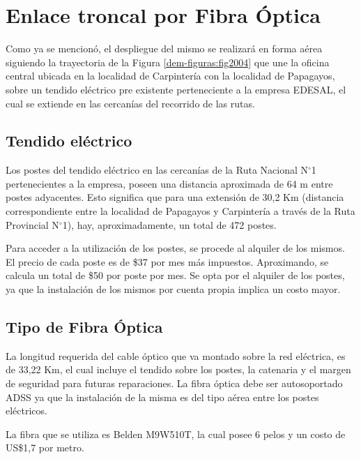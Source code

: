 \section{Enlace troncal por Fibra Óptica}

Como ya se mencionó, el despliegue del mismo se realizará en forma aérea siguiendo la  trayectoria de la Figura \ref{dem-figuras:fig2004} que une la oficina central ubicada en la localidad de Carpintería con la localidad de Papagayos, sobre un tendido eléctrico pre existente perteneciente a la empresa EDESAL, el cual se extiende en las cercanías  del recorrido de las rutas.

\subsection{Tendido eléctrico}

Los postes del tendido eléctrico en las cercanías de la Ruta Nacional N{$^{\circ}$}1 pertenecientes a la empresa, poseen una distancia aproximada de 64 m entre postes adyacentes. Esto significa que para una extensión de 30,2 Km (distancia correspondiente entre la localidad de Papagayos y Carpintería a través de la Ruta Provincial N{$^{\circ}$}1), hay, aproximadamente, un total de 472 postes.


Para acceder a la utilización de los postes, se procede al alquiler de los mismos. El precio de cada poste es de \$37 por mes más impuestos. Aproximando, se calcula un total de \$50 por poste por mes. Se opta por el alquiler de los postes, ya que la instalación de los mismos por cuenta propia implica un costo mayor.

\subsection{Tipo de Fibra Óptica}

La longitud requerida del cable óptico que va montado sobre la red eléctrica, es de 33,22 Km, el cual incluye el tendido sobre los postes, la catenaria y el margen de seguridad para futuras reparaciones. La fibra óptica debe ser autosoportado ADSS ya que la instalación de la misma es del tipo aérea entre los postes eléctricos.

La fibra que se utiliza es Belden M9W510T, la cual posee 6 pelos y un costo de US\$1,7 por metro.


